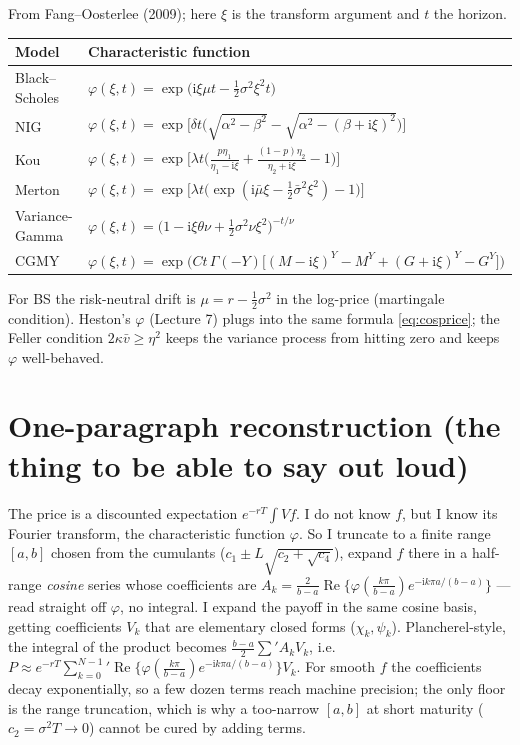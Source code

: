 \documentclass[11pt]{article}
\newcommand{\Real}{\operatorname{Re}}
\newcommand{\ii}{\mathrm{i}}
\newcommand{\ch}{\varphi}
\begin{document}
From Fang--Oosterlee (2009); here $\xi$ is the transform argument and $t$ the horizon.
\begin{center}
\renewcommand{\arraystretch}{1.6}
\begin{tabular}{l l}
\hline
\textbf{Model} & \textbf{Characteristic function} \\
\hline
Black--Scholes & $\ch(\xi,t)=\exp\!\big(\ii\xi\mu t-\tfrac12\sigma^2\xi^2 t\big)$ \\
NIG & $\ch(\xi,t)=\exp\!\big[\delta t\big(\sqrt{\alpha^2-\beta^2}-\sqrt{\alpha^2-(\beta+\ii\xi)^2}\big)\big]$ \\
Kou & $\ch(\xi,t)=\exp\!\big[\lambda t\big(\tfrac{p\eta_1}{\eta_1-\ii\xi}+\tfrac{(1-p)\eta_2}{\eta_2+\ii\xi}-1\big)\big]$ \\
Merton & $\ch(\xi,t)=\exp\!\big[\lambda t\big(\exp(\ii\bar\mu\xi-\tfrac12\bar\sigma^2\xi^2)-1\big)\big]$ \\
Variance-Gamma & $\ch(\xi,t)=\big(1-\ii\xi\theta\nu+\tfrac12\sigma^2\nu\xi^2\big)^{-t/\nu}$ \\
CGMY & $\ch(\xi,t)=\exp\!\big(Ct\,\Gamma(-Y)\big[(M-\ii\xi)^Y-M^Y+(G+\ii\xi)^Y-G^Y\big]\big)$ \\
\hline
\end{tabular}
\end{center}
\noindent For BS the risk-neutral drift is $\mu=r-\tfrac12\sigma^2$ in the log-price (martingale condition).
Heston's $\ch$ (Lecture 7) plugs into the same formula \eqref{eq:cosprice}; the Feller condition
$2\kappa\bar v\ge\eta^2$ keeps the variance process from hitting zero and keeps $\ch$ well-behaved.

\section{One-paragraph reconstruction (the thing to be able to say out loud)}

The price is a discounted expectation $e^{-rT}\!\int V f$. I do not know $f$, but I know its Fourier transform,
the characteristic function $\ch$. So I truncate to a finite range $[a,b]$ chosen from the cumulants
($c_1\pm L\sqrt{c_2+\sqrt{c_4}}$), expand $f$ there in a half-range \emph{cosine} series whose coefficients are
$A_k=\frac{2}{b-a}\Real\{\ch(\frac{k\pi}{b-a})e^{-\ii k\pi a/(b-a)}\}$ --- read straight off $\ch$, no integral.
I expand the payoff in the same cosine basis, getting coefficients $V_k$ that are elementary closed forms
($\chi_k,\psi_k$). Plancherel-style, the integral of the product becomes $\frac{b-a}{2}\sum' A_k V_k$, i.e.
$P\approx e^{-rT}\sum_{k=0}^{N-1}{}'\Real\{\ch(\frac{k\pi}{b-a})e^{-\ii k\pi a/(b-a)}\}V_k$. For smooth $f$ the
coefficients decay exponentially, so a few dozen terms reach machine precision; the only floor is the range
truncation, which is why a too-narrow $[a,b]$ at short maturity ($c_2=\sigma^2T\to0$) cannot be cured by adding
terms.
\end{document}
